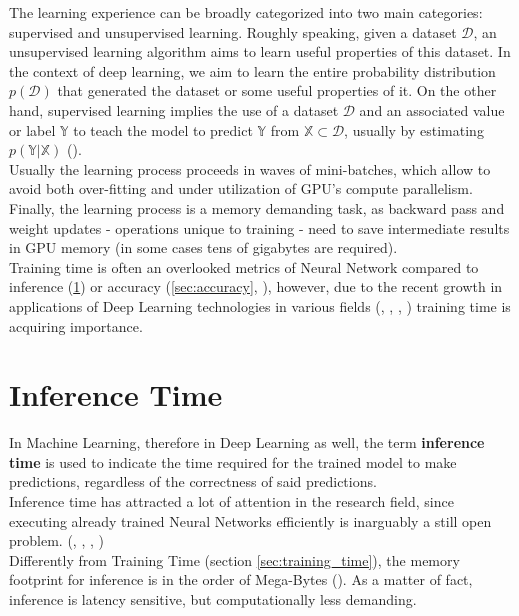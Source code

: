 The learning experience can be broadly categorized into two main categories: supervised and unsupervised learning. Roughly speaking, given a dataset $\mathcal{D}$, an unsupervised learning algorithm aims to learn useful properties of this dataset. In the context of deep learning, we aim to learn the entire probability distribution $p(\mathcal{D})$ that generated the dataset or some useful properties of it. On the other hand, supervised learning implies the use of a dataset $\mathcal{D}$ and an associated value or label $\mathbb{Y}$ to teach the model to predict $\mathbb{Y}$ from $\mathbb{X} \subset \mathcal{D}$, usually by estimating $p(\mathbb{Y} \vert \mathbb{X})$ (\cite{murphy2016overview}).\\
Usually the learning process proceeds in waves of mini-batches, which allow to avoid both over-fitting and under utilization of GPU’s compute parallelism. \cite{8573476}\\
Finally, the learning process is a memory demanding task, as backward pass and weight updates - operations unique to training - need to save intermediate results in GPU memory (in some cases tens of gigabytes are required). \cite{rhu2016vdnn}\\
Training time is often an overlooked metrics of Neural Network compared to inference (\ref{sec:inference_time_definition}) or accuracy (\ref{sec:accuracy}, \cite{8573476}), however, due to the recent growth in applications of Deep Learning technologies in various fields (\cite{bojarski2016end}, \cite{huval2015empirical}, \cite{10.1145/2959100}, \cite{amodei2015deep}) training time is acquiring importance. \cite{8573476}\\

\section{Inference Time}\label{sec:inference_time_definition}
In Machine Learning, therefore in Deep Learning as well, the term \textbf{inference time} is used to indicate the time required for the trained model to make predictions, regardless of the correctness of said predictions. \\
Inference time has attracted a lot of attention in the research field, since executing already trained Neural Networks efficiently is inarguably a still open problem. (\cite{8573476}, \cite{molchanov2017pruning}, \cite{Duarte_2018}, \cite{7900006})\\
Differently from Training Time (section \ref{sec:training_time}), the memory footprint for inference is in the order of Mega-Bytes (\cite{han2016eie}). As a matter of fact, inference is latency sensitive, but computationally less demanding. \cite{8573476}\\


